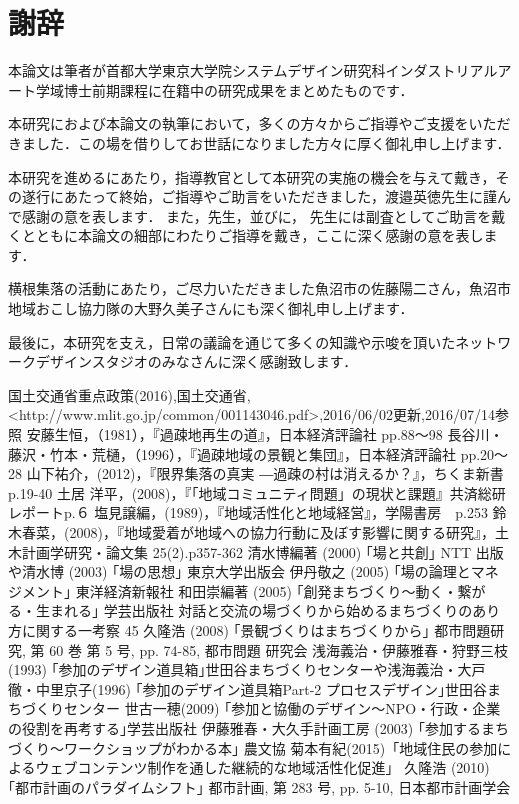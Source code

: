 \documentclass[a4paper]{jsarticle}
\begin{document}
\section*{謝辞}
\par
本論文は筆者が首都大学東京大学院システムデザイン研究科インダストリアルアート学域博士前期課程に在籍中の研究成果をまとめたものです．
\par
本研究におよび本論文の執筆において，多くの方々からご指導やご支援をいただきました．この場を借りしてお世話になりました方々に厚く御礼申し上げます．
\par
本研究を進めるにあたり，指導教官として本研究の実施の機会を与えて戴き，その遂行にあたって終始，ご指導やご助言をいただきました，渡邉英徳先生に謹んで感謝の意を表します．
また，先生，並びに， 先生には副査としてご助言を戴くとともに本論文の細部にわたりご指導を戴き，ここに深く感謝の意を表します．
\par
横根集落の活動にあたり，ご尽力いただきました魚沼市の佐藤陽二さん，魚沼市地域おこし協力隊の大野久美子さんにも深く御礼申し上げます．
\par
最後に，本研究を支え，日常の議論を通じて多くの知識や示唆を頂いたネットワークデザインスタジオのみなさんに深く感謝致します．
\newpage
\begin{thebibliography}{999}

国土交通省重点政策(2016),国土交通省,<http://www.mlit.go.jp/common/001143046.pdf>,2016/06/02更新,2016/07/14参照
安藤生恒，（1981），『過疎地再生の道』，日本経済評論社 pp.88～98
長谷川・藤沢・竹本・荒樋，（1996），『過疎地域の景観と集団』，日本経済評論社 pp.20～28
山下祐介，(2012)，『限界集落の真実 ―過疎の村は消えるか？』，ちくま新書　p.19-40
土居 洋平，(2008)，『｢地域コミュニティ問題」の現状と課題』共済総研レポートp.６
塩見譲編，(1989)，『地域活性化と地域経営』，学陽書房　p.253
鈴木春菜，(2008)，『地域愛着が地域への協力行動に及ぼす影響に関する研究』，土木計画学研究・論文集 25(2).p357-362
清水博編著 (2000) ｢場と共創｣ NTT 出版や清水博 (2003) ｢場の思想｣ 東京大学出版会
伊丹敬之 (2005) ｢場の論理とマネジメント｣ 東洋経済新報社
和田崇編著 (2005) ｢創発まちづくり～動く・繋がる・生まれる｣ 学芸出版社 対話と交流の場づくりから始めるまちづくりのあり方に関する一考察 45
久隆浩 (2008) ｢景観づくりはまちづくりから｣ 都市問題研究, 第 60 巻 第 5 号, pp. 74-85, 都市問題 研究会
浅海義治・伊藤雅春・狩野三枝(1993) ｢参加のデザイン道具箱｣世田谷まちづくりセンターや浅海義治・大戸徹・中里京子(1996) ｢参加のデザイン道具箱Part-2 プロセスデザイン｣世田谷まちづくりセンター
世古一穂(2009) ｢参加と協働のデザイン～NPO・行政・企業の役割を再考する｣学芸出版社
伊藤雅春・大久手計画工房 (2003) ｢参加するまちづくり～ワークショップがわかる本｣ 農文協
菊本有紀(2015)「地域住民の参加によるウェブコンテンツ制作を通した継続的な地域活性化促進」
久隆浩 (2010) ｢都市計画のパラダイムシフト｣ 都市計画, 第 283 号, pp. 5-10, 日本都市計画学会


\end{thebibliography}

\newpage
\end{document}
